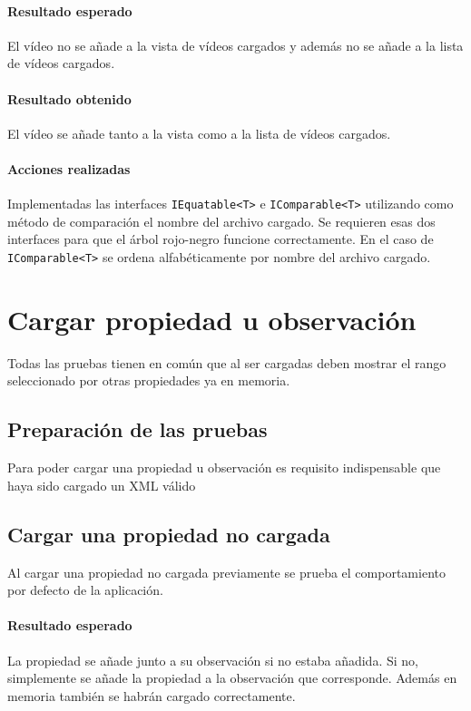 \paragraph{Resultado esperado}
El v\'ideo no se a\~nade a la vista de v\'ideos
cargados y adem\'as no se a\~nade a la lista
de v\'ideos cargados.

\paragraph{Resultado obtenido}
El v\'ideo se a\~nade tanto a la vista como a la lista
de v\'ideos cargados.

\paragraph{Acciones realizadas}
Implementadas las interfaces \texttt{IEquatable<T>} e \texttt{IComparable<T>}
utilizando como m\'etodo de comparaci\'on el nombre del archivo cargado.
Se requieren esas dos interfaces para que el \'arbol rojo-negro funcione correctamente.
En el caso de \texttt{IComparable<T>} se ordena alfab\'eticamente por nombre
del archivo cargado.

\section{Cargar propiedad u observaci\'on}
Todas las pruebas tienen en com\'un que al ser cargadas deben mostrar
el rango seleccionado por otras propiedades ya en memoria.
\subsection{Preparaci\'on de las pruebas}
Para poder cargar una propiedad u observaci\'on es requisito
indispensable que haya sido cargado un XML v\'alido

\subsection{Cargar una propiedad no cargada}
Al cargar una propiedad no cargada previamente
se prueba el comportamiento por defecto de la aplicaci\'on.

\paragraph{Resultado esperado}
La propiedad se a\~nade junto a su observaci\'on
si no estaba a\~nadida. Si no, simplemente se a\~nade la propiedad
a la observaci\'on que corresponde. Adem\'as en memoria tambi\'en
se habr\'an cargado correctamente.


